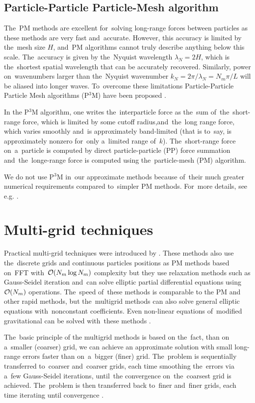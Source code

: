 \subsection{Particle-Particle Particle-Mesh algorithm}
The~PM methods are excellent for~solving long-range forces between particles as these methods are very fast and~accurate. However, this accuracy is limited by the~mesh size $H$, and~PM algorithms cannot truly describe anything below this scale. The~accuracy is given by the~Nyquist wavelength $\lambda_N=2H$, which is the~shortest spatial wavelength that can be accurately recovered. Similarly, power on~wavenumbers larger than the~Nyquist wavenumber $k_N=2\pi/\lambda_N=N_m\pi/L$ will be aliased into longer waves. To~overcome these limitations Particle-Particle Particle Mesh algorithms (P$^3$M) have been proposed \textcite{hockney_10000_1973}.

In the P$^3$M algorithm, one writes the~interparticle force as the~sum of~the~short-range force, which is limited by some cutoff radius,and~the~long range force, which varies smoothly and~is approximately band-limited (that is to~say, is approximately nonzero for~only a~limited range of~$k$). The~short-range force on~a~particle is computed by direct particle-particle (PP) force summation and~the~longe-range force is computed using the~particle-mesh (PM) algorithm.

We do not use P$^3$M in~our approximate methods because of~their much greater numerical requirements compared to~simpler PM methods. For~more details, see e.g. \textcite{Hockney:1988:CSU:62815}.
\section{Multi-grid techniques}
Practical multi-grid techniques were introduced by \textcite{10.2307/2006422}. These methods also use the~discrete grids and continuous particles positions as PM methods based on~FFT with~$\mathcal{O}(N_m\log N_m)$ complexity but they use relaxation methods such as Gauss-Seidel iteration \parencite{doi:10.1002/zamm.19720520813} and~can solve elliptic partial differential equations using $\mathcal{O}(N_m)$ operations. The~speed of~these methods is comparable to the PM and other rapid methods, but the~multigrid methods can also solve general elliptic equations with~nonconstant coefficients. Even non-linear equations of~modified gravitational can be solved with~these methods \parencite{10.5555/42249}.

The~basic principle of the multigrid methods is based on the~fact, than on a~smaller (coarser) grid, we can achieve an approximate solution with small long-range errors faster than on~a~bigger (finer) grid. The~problem is sequentially transferred to~coarser and~coarser grids, each time smoothing the~errors via a~few Gauss-Seidel iterations, until~the convergence on~the~coarsest grid is achieved. The~problem is then transferred back to~finer and~finer grids, each time iterating until convergence \parencite{2011EPJP..126...55D}.
